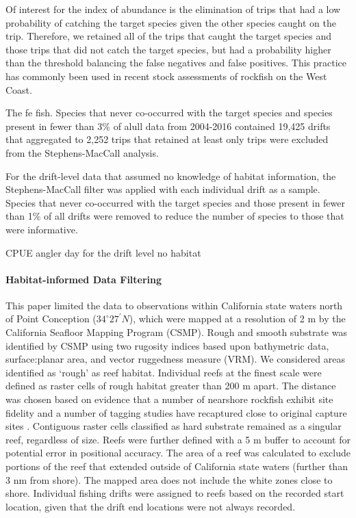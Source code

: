 \documentclass[
  authoryear,
  preprint,
  3p]{elsarticle}
\let\oldparagraph\paragraph
\renewcommand{\paragraph}[1]{\oldparagraph{#1}\mbox{}}
\begin{document}
Of interest for the index of abundance is the elimination of trips that
had a low probability of catching the target species given the other
species caught on the trip. Therefore, we retained all of the trips that
caught the target species and those trips that did not catch the target
species, but had a probability higher than the threshold balancing the
false negatives and false positives. This practice has commonly been
used in recent stock assessments of rockfish on the West Coast.

The fe fish. Species that never co-occurred with the target species and
species present in fewer than 3\% of alull data from 2004-2016 contained
19,425 drifts that aggregated to 2,252 trips that retained at least only
trips were excluded from the Stephens-MacCall analysis.

For the drift-level data that assumed no knowledge of habitat
information, the Stephens-MacCall filter was applied with each
individual drift as a sample. Species that never co-occurred with the
target species and those present in fewer than 1\% of all drifts were
removed to reduce the number of species to those that were informative.

CPUE angler day for the drift level no habitat

\hypertarget{habitat-informed-data-filtering}{%
\paragraph{Habitat-informed Data
Filtering}\label{habitat-informed-data-filtering}}

This paper limited the data to observations within California state
waters north of Point Conception (\(34^\circ 27^\prime N\)), which were
mapped at a resolution of 2 m by the California Seafloor Mapping Program
(CSMP). Rough and smooth substrate was identified by CSMP using two
rugosity indices based upon bathymetric data, surface:planar area, and
vector ruggedness measure (VRM). We considered areas identified as
`rough' as reef habitat. Individual reefs at the finest scale were
defined as raster cells of rough habitat greater than 200 m apart. The
distance was chosen based on evidence that a number of nearshore
rockfish exhibit site fidelity and a number of tagging studies have
recaptured close to original capture sites
\citep{Lea:1999:BAM, Matthews:1985:SSM, Hannah:2011:SFM, Hannah:2012:UNC}.
Contiguous raster cells classified as hard substrate remained as a
singular reef, regardless of size. Reefs were further defined with a 5 m
buffer to account for potential error in positional accuracy. The area
of a reef was calculated to exclude portions of the reef that extended
outside of California state waters (further than 3 nm from shore). The
mapped area does not include the white zones close to shore. Individual
fishing drifts were assigned to reefs based on the recorded start
location, given that the drift end locations were not always recorded.
\end{document}
